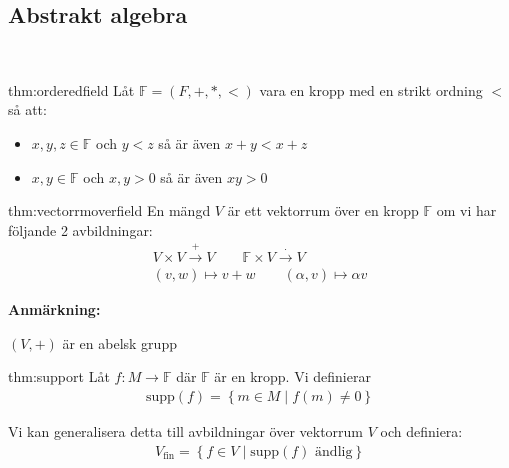 \subsection{Abstrakt algebra}\hfill\\\par
\begin{theo}{thm:orderedfield}
  Låt $\mathbb{F} = (F,+,*,<)$ vara en kropp med en strikt ordning $<$ så att:\par
  \begin{itemize}
    \item $x,y,z\in\mathbb{F}$ och $y<z$ så är även $x+y<x+z$
    \item $x,y\in\mathbb{F}$ och $x,y>0$ så är även $xy>0$
  \end{itemize}
\end{theo}
\par\bigskip
\begin{theo}{thm:vectorrmoverfield}
  En mängd $V$ är ett vektorrum över en kropp $\mathbb{F}$ om vi har följande 2 avbildningar:
  \begin{equation*}
    \begin{gathered}
      V\times V\stackrel{+}{\to}V\qquad \mathbb{F}\times V\stackrel{\cdot}{\to} V\\
      (v,w)\mapsto v+w\qquad(\alpha, v)\mapsto\alpha v
    \end{gathered}
  \end{equation*}
  \par\bigskip
  \noindent\textbf{Anmärkning:}\par
  \noindent $(V,+)$ är en abelsk grupp
\end{theo}
\newpage
\begin{theo}{thm:support}
  Låt $f:M\to\mathbb{F}$ där $\mathbb{F}$ är en kropp. Vi definierar
  \begin{equation*}
    \begin{gathered}
    \text{supp}(f) = \left\{m\in M\;|\; f(m)\neq0\right\}
    \end{gathered}
  \end{equation*}\par
  \noindent Vi kan generalisera detta till avbildningar över vektorrum $V$ och definiera:
  \begin{equation*}
    \begin{gathered}
      V_{\text{fin}} = \left\{f\in V\;|\; \text{supp}(f)\text{ ändlig}\right\}
    \end{gathered}
  \end{equation*}
\end{theo}
